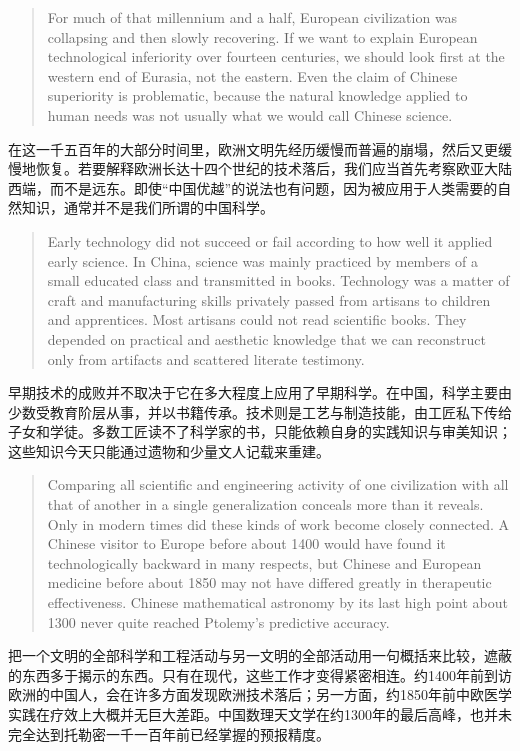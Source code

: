 \documentclass[UTF8,zihao=-4]{ctexart}
\newenvironment{enblock}
  {\par\smallskip\noindent{\scriptsize\bfseries English}\par\begin{quote}\small}
  {\end{quote}}
\newenvironment{zhblock}
  {\par\noindent{\scriptsize\bfseries 中文}\par}
  {\par\medskip}
\begin{document}
\begin{enblock}
For much of that millennium and a half, European civilization was collapsing and then slowly recovering. If we want to explain European technological inferiority over fourteen centuries, we should look first at the western end of Eurasia, not the eastern. Even the claim of Chinese superiority is problematic, because the natural knowledge applied to human needs was not usually what we would call Chinese science.
\end{enblock}
\begin{zhblock}
在这一千五百年的大部分时间里，欧洲文明先经历缓慢而普遍的崩塌，然后又更缓慢地恢复。若要解释欧洲长达十四个世纪的技术落后，我们应当首先考察欧亚大陆西端，而不是远东。即使“中国优越”的说法也有问题，因为被应用于人类需要的自然知识，通常并不是我们所谓的中国科学。
\end{zhblock}

\begin{enblock}
Early technology did not succeed or fail according to how well it applied early science. In China, science was mainly practiced by members of a small educated class and transmitted in books. Technology was a matter of craft and manufacturing skills privately passed from artisans to children and apprentices. Most artisans could not read scientific books. They depended on practical and aesthetic knowledge that we can reconstruct only from artifacts and scattered literate testimony.
\end{enblock}
\begin{zhblock}
早期技术的成败并不取决于它在多大程度上应用了早期科学。在中国，科学主要由少数受教育阶层从事，并以书籍传承。技术则是工艺与制造技能，由工匠私下传给子女和学徒。多数工匠读不了科学家的书，只能依赖自身的实践知识与审美知识；这些知识今天只能通过遗物和少量文人记载来重建。
\end{zhblock}

\begin{enblock}
Comparing all scientific and engineering activity of one civilization with all that of another in a single generalization conceals more than it reveals. Only in modern times did these kinds of work become closely connected. A Chinese visitor to Europe before about 1400 would have found it technologically backward in many respects, but Chinese and European medicine before about 1850 may not have differed greatly in therapeutic effectiveness. Chinese mathematical astronomy by its last high point about 1300 never quite reached Ptolemy's predictive accuracy.
\end{enblock}
\begin{zhblock}
把一个文明的全部科学和工程活动与另一文明的全部活动用一句概括来比较，遮蔽的东西多于揭示的东西。只有在现代，这些工作才变得紧密相连。约1400年前到访欧洲的中国人，会在许多方面发现欧洲技术落后；另一方面，约1850年前中欧医学实践在疗效上大概并无巨大差距。中国数理天文学在约1300年的最后高峰，也并未完全达到托勒密一千一百年前已经掌握的预报精度。
\end{zhblock}
\end{document}
